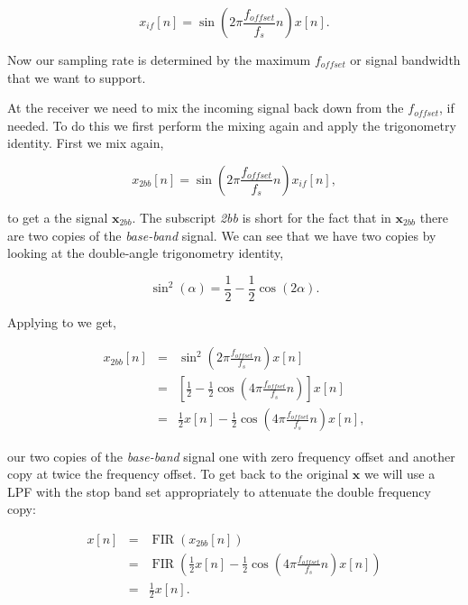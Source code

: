 \begin{equation}
\label{eq:ifmix}
x_{if}[n] = \sin\left(2\pi\frac{f_{offset}}{f_s}n\right)x[n].
\end{equation}	

Now our sampling rate is determined by the maximum $f_{offset}$ or signal bandwidth that we want to support.

At the receiver we need to mix the incoming signal back down from the $f_{offset}$, if needed. To do this we first perform the mixing again and apply the trigonometry identity. First we mix again,

\begin{equation}
\label{eq:2xbb}
x_{2bb}[n] = \sin\left(2\pi\frac{f_{offset}}{f_s}n\right)x_{if}[n],
\end{equation}

to get a the signal $\mathbf{x}_{2bb}$. The subscript \emph{2bb} is short for the fact that in $\mathbf{x}_{2bb}$ there are two copies of the \emph{base-band} signal. We can see that we have two copies by looking at the double-angle trigonometry identity,

\begin{equation}
\label{eq:trigid}
\sin^2(\alpha) = \frac{1}{2} - \frac{1}{2}\cos(2\alpha).
\end{equation}

Applying  to  we get,

\begin{eqnarray}
\label{eq:2bbtrig}
x_{2bb}[n] &=& \sin^2\left(2\pi\frac{f_{offset}}{f_s}n\right)x[n]\\
&=& \left[\frac{1}{2} - \frac{1}{2}\cos(4\pi\frac{f_{offset}}{f_s}n)\right]x[n]\\
&=& \frac{1}{2}x[n] - \frac{1}{2}\cos\left(4\pi\frac{f_{offset}}{f_s}n\right)x[n],
\end{eqnarray}

our two copies of the \emph{base-band} signal one with zero frequency offset and another copy at twice the frequency offset. To get back to the original $\mathbf{x}$ we will use a \ac{LPF} with the stop band set appropriately to attenuate the double frequency copy:

\begin{eqnarray}
\label{eq:fir}
x[n] &=& \operatorname{FIR}(x_{2bb}[n])\\
&=& \operatorname{FIR}\left(\frac{1}{2}x[n] - \frac{1}{2}\cos\left(4\pi\frac{f_{offset}}{f_s}n\right)x[n]\right)\\
&=& \frac{1}{2}x[n].
\end{eqnarray}

